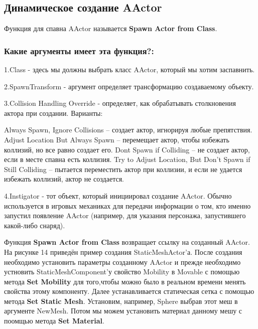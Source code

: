 \subsection{Динамическое создание AActor}

Функция для спавна AActor называется \textbf{Spawn Actor from Class}.

\subsubsection*{Какие аргументы имеет эта функция?:}

1.\hspace{1em}Class - здесь мы должны выбрать класс AActor, который мы хотим
заспавнить.

2.\hspace{1em}SpawnTransform - аргумент определяет трансформацию создаваемому объекту.

3.\hspace{1em}Collision Handling Override - определяет, как обрабатывать 
столкновения актора при создании. Варианты:

Always Spawn, Ignore Collisions – создает актор, игнорируя любые препятствия.
Adjust Location But Always Spawn – перемещает актор, чтобы избежать коллизий, но 
все равно создает его.
Dont Spawn if Colliding – не создает актор, если в месте спавна есть коллизия.
Try to Adjust Location, But Don't Spawn if Still Colliding – пытается переместить 
актор при коллизии, и если не удается избежать коллизий, актор не создается.

4.\hspace{1em}Instigator - тот объект, который инициировал создание AActor.
Обычно используется в игровых механиках для передачи информации о том, кто 
именно запустил появление AActor (например, для указания персонажа, запустившего 
какой-либо снаряд).

Функция \textbf{Spawn Actor from Class} возвращает ссылку на созданный AActor.
На рисунке 14 приведён пример создания StaticMeshActor'а.
После создания необходимо установить параметры созданному AActor и прежде 
необходимо устновить StaticMeshComponent'у свойство Mobility в Movable с помощью 
метода \textbf{Set Mobility} для того,чтобы можно было в реальном времени 
менять свойства этому компоненту.
Далее устанавливается статическая сетка с помощью метода \textbf{Set Static Mesh}.
Установим, например, Sphere выбрав этот меш в аргументе NewMesh.
Потом мы можем установить материал данному мешу с поомщью метода \textbf{Set 
Material}.

